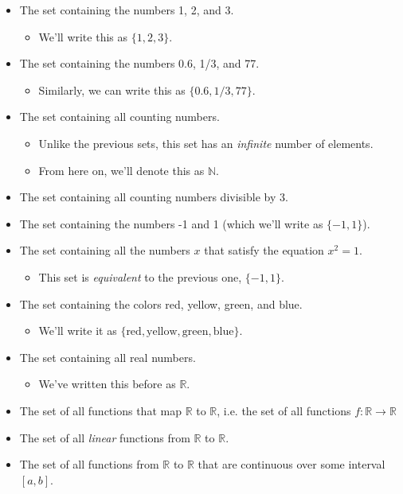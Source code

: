 \begin{itemize}
\item The set containing the numbers 1, 2, and 3. 
\begin{itemize}
\item We'll write this as $\{1, 2, 3\}$.
\end{itemize}
\item The set containing the numbers 0.6, 1/3, and 77.
\begin{itemize}
\item Similarly, we can write this as $\{0.6, 1/3, 77\}$.
\end{itemize}
\item The set containing all counting numbers. 
\begin{itemize}
\item Unlike the previous sets, this set has an \emph{infinite} number of elements. 
\item From here on, we'll denote this as $\mathbb{N}$. 
\end{itemize}
\item The set containing all counting numbers divisible by 3.
\item The set containing the numbers -1 and 1 (which we'll write as $\{-1, 1\}$). 
\item The set containing all the numbers $x$ that satisfy the equation $x^2 = 1$.
\begin{itemize}
\item This set is \emph{equivalent} to the previous one, $\{-1, 1\}$.
\end{itemize}
\item The set containing the colors red, yellow, green, and blue.
\begin{itemize}
\item We'll write it as $\{\text{red}, \text{yellow}, \text{green}, \text{blue}\}$.
\end{itemize}
\item The set containing all real numbers.
\begin{itemize}
\item We've written this before as $\mathbb{R}$. 
\end{itemize}
\item The set of all functions that map $\mathbb{R}$ to $\mathbb{R}$, i.e. the set of all functions $f: \mathbb{R} \rightarrow \mathbb{R}$
\item The set of all \emph{linear} functions from $\mathbb{R}$ to $\mathbb{R}$.
\item The set of all functions from $\mathbb{R}$ to $\mathbb{R}$ that are continuous over some interval $\left[a, b\right]$.
\end{itemize}


